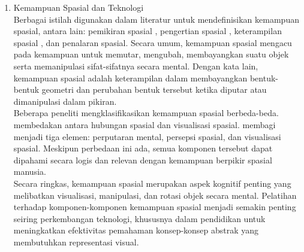 \begin{enumerate}
    \item Kemampuan Spasial dan Teknologi\\
    \hspace*{1cm}Berbagai istilah digunakan dalam literatur untuk mendefinisikan kemampuan spasial, antara lain: pemikiran spasial \citep{yakimanskaya1991}, pengertian spasial \citep{nctm1989}, keterampilan spasial \citep{tartre1990}, dan penalaran spasial. Secara umum, kemampuan spasial mengacu pada kemampuan untuk memutar, mengubah, membayangkan suatu objek serta memanipulasi sifat-sifatnya secara mental. Dengan kata lain, kemampuan spasial adalah keterampilan dalam membayangkan bentuk-bentuk geometri dan perubahan bentuk tersebut ketika diputar atau dimanipulasi dalam pikiran.\\
    \hspace*{1cm}Beberapa peneliti mengklasifikasikan kemampuan spasial berbeda-beda. \citet{pellegrino1982} membedakan antara hubungan spasial dan visualisasi spasial. \citet{linn1985} membagi menjadi tiga elemen: perputaran mental, persepsi spasial, dan visualisasi spasial. Meskipun perbedaan ini ada, semua komponen tersebut dapat dipahami secara logis dan relevan dengan kemampuan berpikir spasial manusia.\\
    \hspace*{1cm}Secara ringkas, kemampuan spasial merupakan aspek kognitif penting yang melibatkan visualisasi, manipulasi, dan rotasi objek secara mental. Pelatihan terhadap komponen-komponen kemampuan spasial menjadi semakin penting seiring perkembangan teknologi, khususnya dalam pendidikan untuk meningkatkan efektivitas pemahaman konsep-konsep abstrak yang membutuhkan representasi visual.


\end{enumerate}
